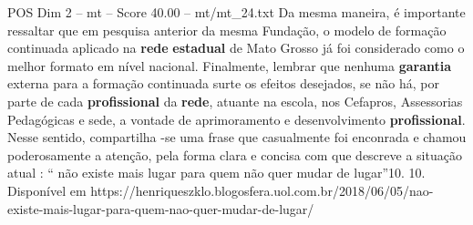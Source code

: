 \begin{textsample}{POS Dim 2 – mt – Score 40.00 – mt/mt\_24.txt}
Da mesma maneira, é importante ressaltar que em pesquisa anterior da mesma Fundação, o modelo de formação continuada aplicado na \textbf{rede} \textbf{estadual} de Mato Grosso já foi considerado como o melhor formato em nível nacional.
Finalmente, lembrar que nenhuma \textbf{garantia} externa para a formação continuada surte os efeitos desejados, se não há, por parte de cada \textbf{profissional} da \textbf{rede}, atuante na escola, nos Cefapros, Assessorias Pedagógicas e sede, a vontade de aprimoramento e desenvolvimento \textbf{profissional}.
Nesse sentido, compartilha -se uma frase que casualmente foi enconrada e chamou poderosamente a atenção, pela forma clara e concisa com que descreve a situação atual : “ não existe mais lugar para quem não quer mudar de lugar”10. 10.
Disponível em https://henriqueszklo.blogosfera.uol.com.br/2018/06/05/nao-existe-mais-lugar-para-quem-nao-quer-mudar-de-lugar/

\end{textsample}
